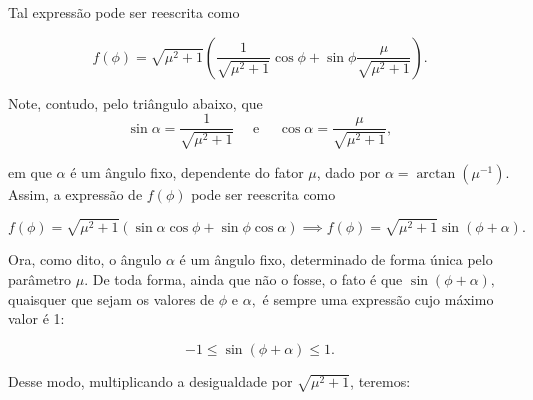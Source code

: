 \begin{exemplo}
Tal expressão pode ser reescrita como

$$ f(\phi) = \sqrt {\mu^2 +1} \left( \dfrac{1}{\sqrt {\mu^2 +1}}\cos \phi + \sin \phi \dfrac{\mu}{\sqrt {\mu^2 +1}} \right).$$

Note, contudo, pelo triângulo abaixo, que
$$ \sin \alpha = \dfrac{1}{\sqrt {\mu^2 +1}} \quad \text{ e } \quad \cos \alpha = \dfrac{\mu}{\sqrt {\mu^2 +1}}, $$

\noindent em que $\alpha$ é um ângulo fixo, dependente do fator $\mu$, dado por $\alpha = \arctan (\mu^{-1})$. Assim, a expressão de $f(\phi)$ pode ser reescrita como

$$ f(\phi) = \sqrt {\mu^2 +1}  \left( \sin \alpha \cos \phi + \sin \phi \cos \alpha    \right) \implies f(\phi) = \sqrt {\mu^2 +1} \sin (\phi + \alpha).$$

\vspace{0.3cm}

\begin{center}
    



\end{center}






Ora, como dito, o ângulo $\alpha$ é um ângulo fixo, determinado de forma única pelo parâmetro $\mu.$ De toda forma, ainda que não o fosse, o fato é que $\sin (\phi+\alpha),$ quaisquer que sejam os valores de $\phi$ e $\alpha,$ é sempre uma expressão cujo máximo valor é 1:

$$ -1 \leq \sin (\phi+\alpha) \leq 1.$$

Desse modo, multiplicando a desigualdade por $\sqrt {\mu^2 +1}$, teremos:


\end{exemplo}
